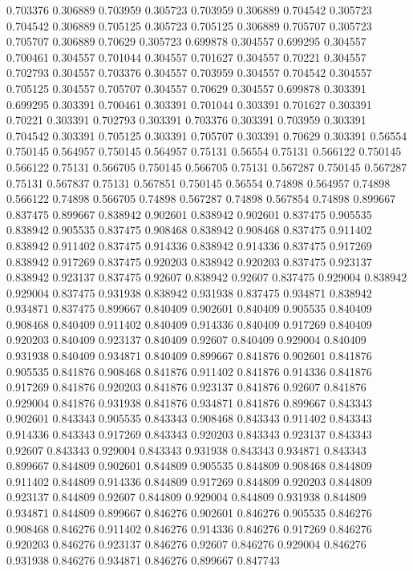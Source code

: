 0.703376 0.306889
0.703959 0.305723
0.703959 0.306889
0.704542 0.305723
0.704542 0.306889
0.705125 0.305723
0.705125 0.306889
0.705707 0.305723
0.705707 0.306889
0.70629 0.305723
0.699878 0.304557
0.699295 0.304557
0.700461 0.304557
0.701044 0.304557
0.701627 0.304557
0.70221 0.304557
0.702793 0.304557
0.703376 0.304557
0.703959 0.304557
0.704542 0.304557
0.705125 0.304557
0.705707 0.304557
0.70629 0.304557
0.699878 0.303391
0.699295 0.303391
0.700461 0.303391
0.701044 0.303391
0.701627 0.303391
0.70221 0.303391
0.702793 0.303391
0.703376 0.303391
0.703959 0.303391
0.704542 0.303391
0.705125 0.303391
0.705707 0.303391
0.70629 0.303391
0.56554 0.750145
0.564957 0.750145
0.564957 0.75131
0.56554 0.75131
0.566122 0.750145
0.566122 0.75131
0.566705 0.750145
0.566705 0.75131
0.567287 0.750145
0.567287 0.75131
0.567837 0.75131
0.567851 0.750145
0.56554 0.74898
0.564957 0.74898
0.566122 0.74898
0.566705 0.74898
0.567287 0.74898
0.567854 0.74898
0.899667 0.837475
0.899667 0.838942
0.902601 0.838942
0.902601 0.837475
0.905535 0.838942
0.905535 0.837475
0.908468 0.838942
0.908468 0.837475
0.911402 0.838942
0.911402 0.837475
0.914336 0.838942
0.914336 0.837475
0.917269 0.838942
0.917269 0.837475
0.920203 0.838942
0.920203 0.837475
0.923137 0.838942
0.923137 0.837475
0.92607 0.838942
0.92607 0.837475
0.929004 0.838942
0.929004 0.837475
0.931938 0.838942
0.931938 0.837475
0.934871 0.838942
0.934871 0.837475
0.899667 0.840409
0.902601 0.840409
0.905535 0.840409
0.908468 0.840409
0.911402 0.840409
0.914336 0.840409
0.917269 0.840409
0.920203 0.840409
0.923137 0.840409
0.92607 0.840409
0.929004 0.840409
0.931938 0.840409
0.934871 0.840409
0.899667 0.841876
0.902601 0.841876
0.905535 0.841876
0.908468 0.841876
0.911402 0.841876
0.914336 0.841876
0.917269 0.841876
0.920203 0.841876
0.923137 0.841876
0.92607 0.841876
0.929004 0.841876
0.931938 0.841876
0.934871 0.841876
0.899667 0.843343
0.902601 0.843343
0.905535 0.843343
0.908468 0.843343
0.911402 0.843343
0.914336 0.843343
0.917269 0.843343
0.920203 0.843343
0.923137 0.843343
0.92607 0.843343
0.929004 0.843343
0.931938 0.843343
0.934871 0.843343
0.899667 0.844809
0.902601 0.844809
0.905535 0.844809
0.908468 0.844809
0.911402 0.844809
0.914336 0.844809
0.917269 0.844809
0.920203 0.844809
0.923137 0.844809
0.92607 0.844809
0.929004 0.844809
0.931938 0.844809
0.934871 0.844809
0.899667 0.846276
0.902601 0.846276
0.905535 0.846276
0.908468 0.846276
0.911402 0.846276
0.914336 0.846276
0.917269 0.846276
0.920203 0.846276
0.923137 0.846276
0.92607 0.846276
0.929004 0.846276
0.931938 0.846276
0.934871 0.846276
0.899667 0.847743
